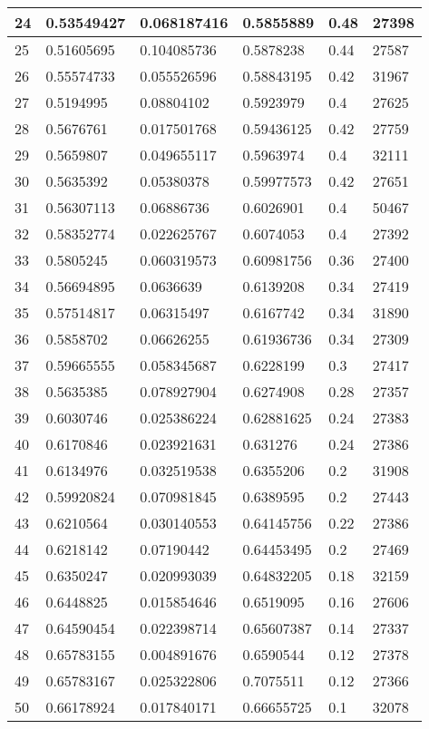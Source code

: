 \begin{longtable}{|l|l|l|l|l|l|}
24 & 0.53549427 & 0.068187416 & 0.5855889 & 0.48 & 27398 \\ \hline 
25 & 0.51605695 & 0.104085736 & 0.5878238 & 0.44 & 27587 \\ \hline 
26 & 0.55574733 & 0.055526596 & 0.58843195 & 0.42 & 31967 \\ \hline 
27 & 0.5194995 & 0.08804102 & 0.5923979 & 0.4 & 27625 \\ \hline 
28 & 0.5676761 & 0.017501768 & 0.59436125 & 0.42 & 27759 \\ \hline 
29 & 0.5659807 & 0.049655117 & 0.5963974 & 0.4 & 32111 \\ \hline 
30 & 0.5635392 & 0.05380378 & 0.59977573 & 0.42 & 27651 \\ \hline 
31 & 0.56307113 & 0.06886736 & 0.6026901 & 0.4 & 50467 \\ \hline 
32 & 0.58352774 & 0.022625767 & 0.6074053 & 0.4 & 27392 \\ \hline 
33 & 0.5805245 & 0.060319573 & 0.60981756 & 0.36 & 27400 \\ \hline 
34 & 0.56694895 & 0.0636639 & 0.6139208 & 0.34 & 27419 \\ \hline 
35 & 0.57514817 & 0.06315497 & 0.6167742 & 0.34 & 31890 \\ \hline 
36 & 0.5858702 & 0.06626255 & 0.61936736 & 0.34 & 27309 \\ \hline 
37 & 0.59665555 & 0.058345687 & 0.6228199 & 0.3 & 27417 \\ \hline 
38 & 0.5635385 & 0.078927904 & 0.6274908 & 0.28 & 27357 \\ \hline 
39 & 0.6030746 & 0.025386224 & 0.62881625 & 0.24 & 27383 \\ \hline 
40 & 0.6170846 & 0.023921631 & 0.631276 & 0.24 & 27386 \\ \hline 
41 & 0.6134976 & 0.032519538 & 0.6355206 & 0.2 & 31908 \\ \hline 
42 & 0.59920824 & 0.070981845 & 0.6389595 & 0.2 & 27443 \\ \hline 
43 & 0.6210564 & 0.030140553 & 0.64145756 & 0.22 & 27386 \\ \hline 
44 & 0.6218142 & 0.07190442 & 0.64453495 & 0.2 & 27469 \\ \hline 
45 & 0.6350247 & 0.020993039 & 0.64832205 & 0.18 & 32159 \\ \hline 
46 & 0.6448825 & 0.015854646 & 0.6519095 & 0.16 & 27606 \\ \hline 
47 & 0.64590454 & 0.022398714 & 0.65607387 & 0.14 & 27337 \\ \hline 
48 & 0.65783155 & 0.004891676 & 0.6590544 & 0.12 & 27378 \\ \hline 
49 & 0.65783167 & 0.025322806 & 0.7075511 & 0.12 & 27366 \\ \hline 
50 & 0.66178924 & 0.017840171 & 0.66655725 & 0.1 & 32078 \\ \hline 
\end{longtable}